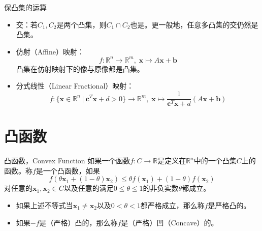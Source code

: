 \begin{frame}

\begin{block}{保凸集的运算}
\begin{itemize}
\item 交：若$C_1,C_2$是两个凸集，则$C_1\cap C_2$也是。更一般地，任意多凸集的交仍然是凸集。
\item 仿射（Affine）映射：
$$f: \mathbb{R}^n \to \mathbb{R}^m, \; \mathbf{x} \mapsto A\mathbf{x} + \mathbf{b}$$
凸集在仿射映射下的像与原像都是凸集。
\item 分式线性（Linear Fractional）映射：
$$f: \{ \mathbf{x} \in \mathbb{R}^n \ |\ \mathbf{c}^T\mathbf{x} + d > 0 \} \to \mathbb{R}^m, \; \mathbf{x} \mapsto \dfrac{1}{\mathbf{c}^T\mathbf{x} + d}(A\mathbf{x} + \mathbf{b})$$
\end{itemize}

\end{block}

\end{frame}







\section{凸函数}


\begin{frame}

\begin{block}{凸函数，Convex Function}
如果一个函数$f: C\to \mathbb{R}$是定义在$\mathbb{R}^n$中的一个凸集$C$上的函数。称$f$是一个凸函数，如果
$$f(\theta\mathbf{x}_1 + (1-\theta)\mathbf{x}_2) \le \theta f(\mathbf{x}_1) + (1-\theta)f(\mathbf{x}_2)$$
对任意的$\mathbf{x}_1, \mathbf{x}_2 \in C$以及任意的满足$0\le\theta\le1$的非负实数$\theta$都成立。
\begin{itemize}
\item 如果上述不等式当$\mathbf{x}_1 \neq \mathbf{x}_2$以及$0<\theta<1$都严格成立，那么称$f$是严格凸的。
\item 如果$-f$是（严格）凸的，那么称$f$是（严格）凹（Concave）的。
\end{itemize}
\end{block}

\end{frame}

